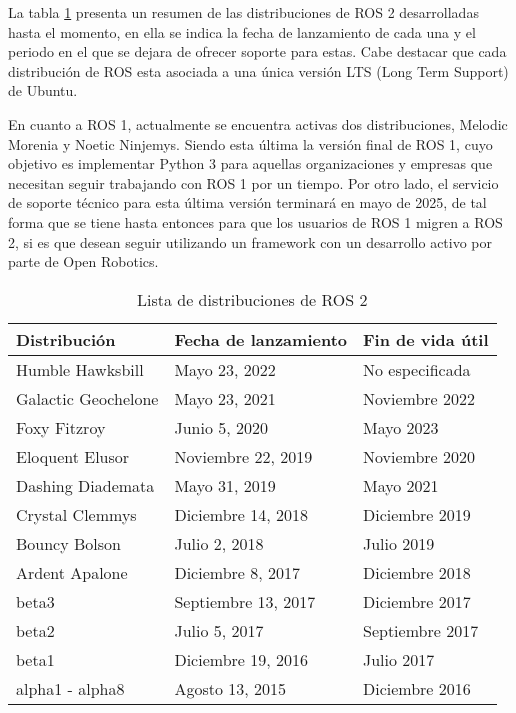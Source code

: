 La tabla \ref{tab:rosd} presenta un resumen de las distribuciones de ROS 2 desarrolladas hasta el momento, en ella se indica la fecha de lanzamiento de cada una y el periodo en el que se dejara de ofrecer soporte para estas. Cabe destacar que cada distribución de ROS esta asociada a una única versión LTS (Long Term Support) de Ubuntu.

En cuanto a ROS 1, actualmente se encuentra activas dos distribuciones, Melodic Morenia y Noetic Ninjemys. Siendo esta última la versión final de ROS 1, cuyo objetivo es implementar Python 3 para aquellas organizaciones y empresas que necesitan seguir trabajando con ROS 1 por un tiempo. Por otro lado, el servicio de soporte técnico para esta última versión terminará en mayo de 2025, de tal forma que se tiene hasta entonces para que los usuarios de ROS 1 migren a ROS 2, si es que desean seguir utilizando un framework con un desarrollo activo por parte de Open Robotics.

\begin{table}
    \centering
    \begin{tabular}{lll}
        \hline
        \textbf{Distribución} & \textbf{Fecha de lanzamiento} & \textbf{Fin de vida útil}\\
        \hline \hline
        Humble Hawksbill & Mayo 23, 2022 & No especificada\\
        Galactic Geochelone & Mayo 23, 2021 & Noviembre 2022\\
        Foxy Fitzroy & Junio 5, 2020 & Mayo 2023\\
        Eloquent Elusor & Noviembre  22, 2019 & Noviembre 2020\\
        Dashing Diademata & Mayo 31, 2019 & Mayo 2021\\
        Crystal Clemmys & Diciembre 14, 2018 & Diciembre 2019\\
        Bouncy Bolson & Julio 2, 2018 & Julio 2019\\
        Ardent Apalone & Diciembre 8, 2017 & Diciembre 2018\\
        beta3 & Septiembre 13, 2017 & Diciembre 2017\\
        beta2 & Julio 5, 2017 & Septiembre 2017\\
        beta1 & Diciembre 19, 2016 & Julio 2017\\
        alpha1 - alpha8 & Agosto 13, 2015 & Diciembre 2016\\
        \hline \hline
    \end{tabular}
    \caption{Lista de distribuciones de ROS 2}
    \label{tab:rosd}
\end{table}

